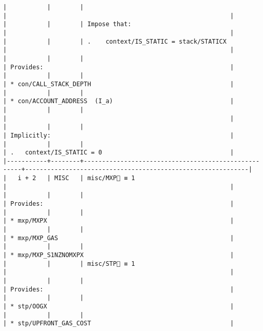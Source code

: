 \documentclass[varwidth=\maxdimen,margin=0.5cm,multi={verbatim}]{standalone}
\begin{document}
\begin{verbatim}
|           |        |                                                     |                                                             |
|           |        | Impose that:                                        |                                                             |
|           |        | .    context/IS_STATIC = stack/STATICX              |                                                             |
|           |        |                                                     | Provides:                                                   |
|           |        |                                                     | * con/CALL_STACK_DEPTH                                      |
|           |        |                                                     | * con/ACCOUNT_ADDRESS  (I_a)                                |
|           |        |                                                     |                                                             |
|           |        |                                                     | Implicitly:                                                 |
|           |        |                                                     | .   context/IS_STATIC = 0                                   |
|-----------+--------+-----------------------------------------------------+-------------------------------------------------------------|
|   i + 2   | MISC   | misc/MXP🚩 ≡ 1                                      |                                                             |
|           |        |                                                     | Provides:                                                   |
|           |        |                                                     | * mxp/MXPX                                                  |
|           |        |                                                     | * mxp/MXP_GAS                                               |
|           |        |                                                     | * mxp/MXP_S1NZNOMXPX                                        |
|           |        | misc/STP🚩 ≡ 1                                      |                                                             |
|           |        |                                                     | Provides:                                                   |
|           |        |                                                     | * stp/OOGX                                                  |
|           |        |                                                     | * stp/UPFRONT_GAS_COST                                      |

\end{verbatim}
\end{document}
